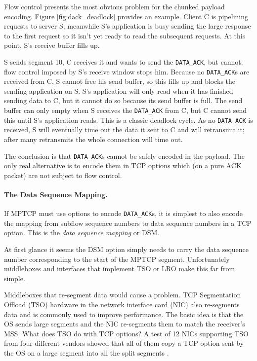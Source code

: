 Flow control presents the most obvious problem for the
chunked payload encoding.  Figure \ref{fig:dack_deadlock} provides an
example. Client C is pipelining requests to server S; meanwhile S's
application is busy sending the large response to the first request so
it isn't yet ready to read the subsequent requests.  At this point,
S's receive buffer fills up.

S sends segment 10, C receives it and wants to send the \texttt{DATA\_ACK}, but
cannot: flow control imposed by S's receive window stops him.
Because no \texttt{DATA\_ACK}s are received from C, S cannot free his send
buffer, so this fills up and blocks the sending application on S.  S's
application will only read when it has finished sending data to C, but
it cannot do so because its send buffer is full.  The send buffer can
only empty when S receives the \texttt{DATA\_ACK} from C, but C cannot send this 
until S's application reads.  This is a classic deadlock cycle.
As no \texttt{DATA\_ACK} is received, S will eventually time out the data it
sent to C and will retransmit it;  after many retransmits the whole connection will time out.

The conclusion is that \texttt{DATA\_ACK}s cannot be safely encoded in the
payload.  The only real alternative is to encode them in TCP options
which (on a pure ACK packet) are not subject to flow control.  

\paragraph{The Data Sequence Mapping.} 
If MPTCP must use options to encode \texttt{DATA\_ACK}s, it is simplest to also
encode the mapping from subflow sequence numbers to data sequence
numbers in a TCP option.  This is the {\em data sequence
mapping} or DSM.

At first glance it seems the {\sc DSM} option simply needs to carry the data
sequence number corresponding to the start of the MPTCP segment.
Unfortunately middleboxes and interfaces that implement TSO or LRO make this far from
simple.  

Middleboxes that re-segment data would cause a problem.
TCP Segmentation Offload (TSO) hardware in the
network interface card (NIC) also re-segments data and is commonly used to improve performance.
The basic idea is that the OS sends large segments and the NIC 
re-segments them to match the receiver's MSS.  What does TSO do 
with TCP options?  A test of 12 NICs supporting
TSO from four different vendors showed that all of them copy a TCP option sent
by the OS on a large segment into all the split segments \cite{raiciu2012hard}.

